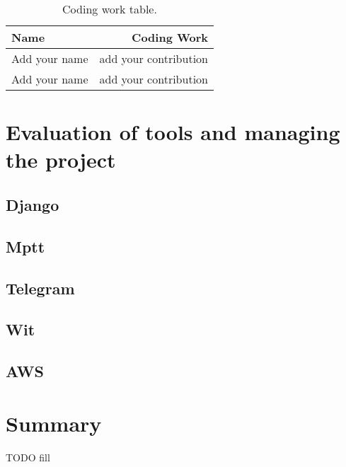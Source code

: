 \documentclass[a4paper]{article}
\begin{document}
\begin{table}
\centering
\begin{tabular}{l|r}
Name & Coding Work \\\hline
Add your name & add your contribution \\
Add your name & add your contribution
\end{tabular}
\caption{\label{tab:codingwork}Coding work table.}
\end{table}

\section{Evaluation of tools and managing the project}
\subsection{Django}
\subsection{Mptt}
\subsection{Telegram}
\subsection{Wit}
\subsection{AWS}

\section{Summary}
TODO fill
\end{document}
